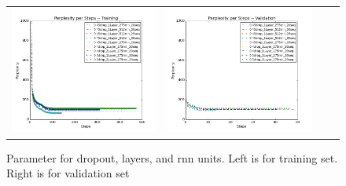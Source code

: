 \documentclass{article}
\begin{document}
\begin{figure}[h]
\centering
\begin{subfigure}
  \begin{tabular}{cccc}
  {\includegraphics[width = 50mm]{../lstm_me/fig/goodlog_train.png}}&
  {\includegraphics[width = 50mm]{../lstm_me/fig/goodlog_val.png}}
  \end{tabular}
\end{subfigure}
\caption{Parameter for dropout, layers, and rnn units. Left is for training set. Right is for validation set}
\end{figure}
\end{document}
